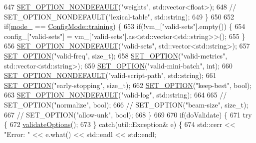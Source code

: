 \begin{DoxyCode}
647     \hyperlink{config__parser_8cpp_a662e89992591378e43abcff938a17669}{SET\_OPTION\_NONDEFAULT}(\textcolor{stringliteral}{"weights"}, std::vector<float>);
648     \textcolor{comment}{// SET\_OPTION\_NONDEFAULT("lexical-table", std::string);}
649   \}
650 
652   \textcolor{keywordflow}{if}(\hyperlink{classmarian_1_1ConfigParser_ae3bb2ffc2601222cc53734a60ab1f980}{mode\_} == \hyperlink{namespacemarian_aaddd4b008ff5352b1fe7e16574f7e1f9ac185ddac8b5a8f5aa23c5b80bc12d214}{ConfigMode::training}) \{
653     \textcolor{keywordflow}{if}(!vm\_[\textcolor{stringliteral}{"valid-sets"}].empty()) \{
654       config\_[\textcolor{stringliteral}{"valid-sets"}] = vm\_[\textcolor{stringliteral}{"valid-sets"}].as<std::vector<std::string>>();
655     \}
656     \hyperlink{config__parser_8cpp_a662e89992591378e43abcff938a17669}{SET\_OPTION\_NONDEFAULT}(\textcolor{stringliteral}{"valid-sets"}, std::vector<std::string>);
657     \hyperlink{config__parser_8cpp_affc23be689aba6d401f64257177c293c}{SET\_OPTION}(\textcolor{stringliteral}{"valid-freq"}, \textcolor{keywordtype}{size\_t});
658     \hyperlink{config__parser_8cpp_affc23be689aba6d401f64257177c293c}{SET\_OPTION}(\textcolor{stringliteral}{"valid-metrics"}, std::vector<std::string>);
659     \hyperlink{config__parser_8cpp_affc23be689aba6d401f64257177c293c}{SET\_OPTION}(\textcolor{stringliteral}{"valid-mini-batch"}, \textcolor{keywordtype}{int});
660     \hyperlink{config__parser_8cpp_a662e89992591378e43abcff938a17669}{SET\_OPTION\_NONDEFAULT}(\textcolor{stringliteral}{"valid-script-path"}, std::string);
661     \hyperlink{config__parser_8cpp_affc23be689aba6d401f64257177c293c}{SET\_OPTION}(\textcolor{stringliteral}{"early-stopping"}, \textcolor{keywordtype}{size\_t});
662     \hyperlink{config__parser_8cpp_affc23be689aba6d401f64257177c293c}{SET\_OPTION}(\textcolor{stringliteral}{"keep-best"}, \textcolor{keywordtype}{bool});
663     \hyperlink{config__parser_8cpp_a662e89992591378e43abcff938a17669}{SET\_OPTION\_NONDEFAULT}(\textcolor{stringliteral}{"valid-log"}, std::string);
664 
665     \textcolor{comment}{// SET\_OPTION("normalize", bool);}
666     \textcolor{comment}{// SET\_OPTION("beam-size", size\_t);}
667     \textcolor{comment}{// SET\_OPTION("allow-unk", bool);}
668   \}
669 
670   \textcolor{keywordflow}{if}(doValidate) \{
671     \textcolor{keywordflow}{try} \{
672       \hyperlink{classmarian_1_1ConfigParser_abbe3a863f0c0599f1aab53e446291b02}{validateOptions}();
673     \} \textcolor{keywordflow}{catch}(util::Exception& e) \{
674       std::cerr << \textcolor{stringliteral}{"Error: "} << e.what() << std::endl << std::endl;

\end{DoxyCode}
